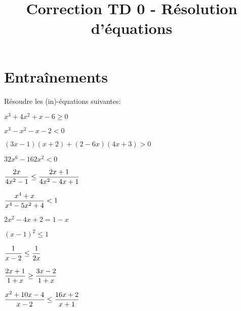 \documentclass[a4paper, 11pt]{article}
\newcommand{\type}{TD }
\renewcommand{\type}{Correction TD }
\begin{document}
\title{\type 0 - Résolution d'équations}


\section*{Entraînements}
\begin{exercice}
 Résoudre les (in)-équations suivantes: 

\begin{enumerate}
\begin{minipage}[t]{0.45\textwidth}

\item $x^3+4x^2+x-6\geq 0 $ 
\item  $x^3-x^2-x-2<0 $ 
\item  $(3x-1)(x+2)+(2-6x)(4x+3)>0$
\item $32x^6-162x^2<0$
\item  $\displaystyle\frac{2x}{4x^2-1}\leq \displaystyle\frac{2x+1}{4x^2-4x+1}$
\item  $ \displaystyle\frac{x^4+x}{x^4-5x^2+4}<1 $
\end{minipage}
\begin{minipage}[t]{0.45\textwidth}
\item  $2x^2-4x+2=1-x$
\item  $(x-1)^2\leq 1$
\item $\displaystyle\frac{1}{x-2}\leq \displaystyle\frac{1}{2x}$
\item $\displaystyle\frac{2x+1}{1+x}\geq \displaystyle\frac{3x-2}{1+x}$
\item $\displaystyle\frac{x^2+10x-4}{x-2}\leq \displaystyle\frac{16x+2}{x+1}$


\end{minipage}
\end{enumerate}

\end{exercice}
\end{document}
